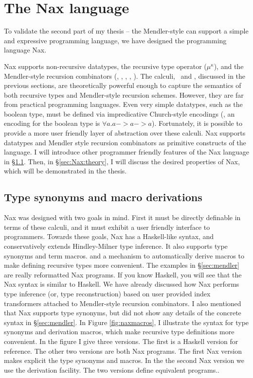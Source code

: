 \section{The Nax language}\label{sec:Nax}

To validate the second part of my thesis -- the Mendler-style can support 
a simple and expressive programming language, we have designed the
programming language Nax.

Nax supports non-recursive datatypes, the recursive type
operator ($\mu^\kappa$), and the Mendler-style recursion combinators (\MIt, \MPr,
\McvIt, \McvPr, \MsfIt). The calculi, \Fi\ and \Fixi,
discussed in the previous sections, are theoretically powerful enough to
capture the semantics of both recursive types and Mendler-style recursion schemes.
However, they are far from practical programming languages. Even very simple
datatypes, such as the boolean type, must be defined via impredicative 
Church-style encodings
(\eg, an encoding for the boolean type is $\forall a . a -> a -> a$). 
Fortunately, it is possible to provide a more user friendly layer of abstraction
over these calculi. Nax supports datatypes and Mendler style recursion
combinators as primitive constructs of the language. I will introduce other
programmer friendly features of the Nax language in \S\ref{sec:Nax:tysym}.
Then, in \S\ref{sec:Nax:theory}, I will discuss the desired properties of Nax,
which will be demonstrated in the thesis.

\subsection{Type synonyms and macro derivations}\label{sec:Nax:tysym}

Nax was designed with two goals in mind. First it must be
directly definable in terms of these calculi, and it must exhibit a user friendly
interface to programmers. Towards these goals, 
Nax has a Haskell-like syntax, and conservatively extends Hindley-Milner
type inference. It also supports type synonyms and term macros. and a mechanism to
automatically derive macros to make defining
recursive types more convenient. The examples in \S\ref{sec:mendler}
are really reformatted Nax programs. If you know Haskell, you will see
that the Nax syntax is similar to Haskell. We have already discussed how Nax performs
type inference (or, type reconstruction) based on user provided
index transformers attached to Mendler-style recursion combinators.
I also mentioned that Nax supports type synonyms, but did not
show any details of the concrete syntax in \S\ref{sec:mendler}. In Figure \ref{fig:naxmacros},
I illustrate the syntax for type synonyms and derivation macros, which make
recursive type definitions more convenient. In the figure I give three
versions. The first is a Haskell version for reference. The other
two versions are both Nax programs. The first Nax version makes explicit the type synonyms
and macros. In the the second Nax version we use the derivation facility.
The two versions define equivalent programs..

